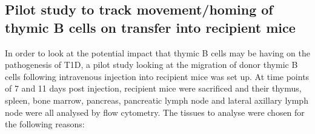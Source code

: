 \subsection{Pilot study to track movement/homing of thymic B cells on transfer into recipient mice}
In order to look at the potential impact that thymic B cells may be having on the pathogenesis of T1D, a pilot study looking at the migration of donor thymic B cells following intravenous injection into recipient mice was set up. 
At time points of 7 and 11 days post injection, recipient mice were sacrificed and their thymus, spleen, bone marrow, pancreas, pancreatic lymph node and lateral axillary lymph node were all analysed by flow cytometry.
The tissues to analyse were chosen for the following reasons:
